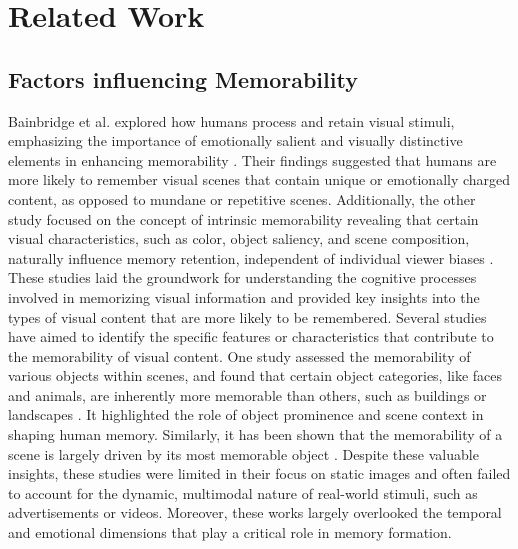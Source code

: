 \section{Related Work}
\subsection{Factors influencing Memorability}
Bainbridge et al. explored how humans process and retain visual stimuli, emphasizing the importance of emotionally salient and visually distinctive elements in enhancing memorability \cite{khosla2013modifying}. Their findings suggested that humans are more likely to remember visual scenes that contain unique or emotionally charged content, as opposed to mundane or repetitive scenes. Additionally, the other study focused on the concept of intrinsic memorability revealing that certain visual characteristics, such as color, object saliency, and scene composition, naturally influence memory retention, independent of individual viewer biases \cite{khosla2015understanding}. These studies laid the groundwork for understanding the cognitive processes involved in memorizing visual information and provided key insights into the types of visual content that are more likely to be remembered.
Several studies have aimed to identify the specific features or characteristics that contribute to the memorability of visual content. One study assessed the memorability of various objects within scenes, and found that certain object categories, like faces and animals, are inherently more memorable than others, such as buildings or landscapes \cite{isola2011understanding}. It highlighted the role of object prominence and scene context in shaping human memory. Similarly, it has been shown that the memorability of a scene is largely driven by its most memorable object \cite{7410487}. Despite these valuable insights, these studies were limited in their focus on static images and often failed to account for the dynamic, multimodal nature of real-world stimuli, such as advertisements or videos. Moreover, these works largely overlooked the temporal and emotional dimensions that play a critical role in memory formation.

